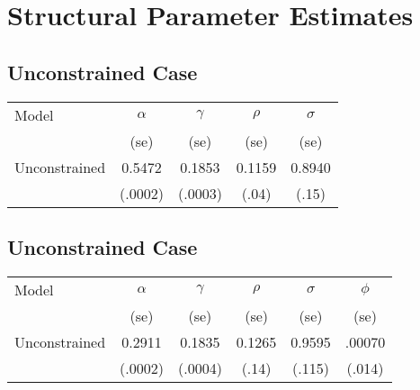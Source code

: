 \documentclass{article}
\begin{document}
\section{Structural Parameter Estimates}
\subsection{Unconstrained Case}

\begin{center}
\begin{tabular}{l | c c c c}
Model & $\alpha$ & $\gamma$ & $\rho$ & $\sigma$\\
 & \tiny{(se)} & \tiny{(se)} & \tiny{(se)} & \tiny{(se)}\\
 \hline
Unconstrained & 0.5472 & 0.1853 & 0.1159 & 0.8940\\
 & \tiny{(.0002)} & \tiny{(.0003)} & \tiny{(.04)} & \tiny{(.15)}\\
\hline
\end{tabular}
\end{center}


\subsection{Unconstrained Case}

\begin{center}
\begin{tabular}{l | c c c c c}
Model & $\alpha$ & $\gamma$ & $\rho$ & $\sigma$ & $\phi$ \\
 & \tiny{(se)} & \tiny{(se)} & \tiny{(se)} & \tiny{(se)} & \tiny{(se)}\\
 \hline
Unconstrained & 0.2911 & 0.1835 & 0.1265 & 0.9595 & .00070\\
 & \tiny{(.0002)} & \tiny{(.0004)} & \tiny{(.14)} & \tiny{(.115)} & \tiny{(.014)}\\
\hline
\end{tabular}
\end{center}
\end{document}
